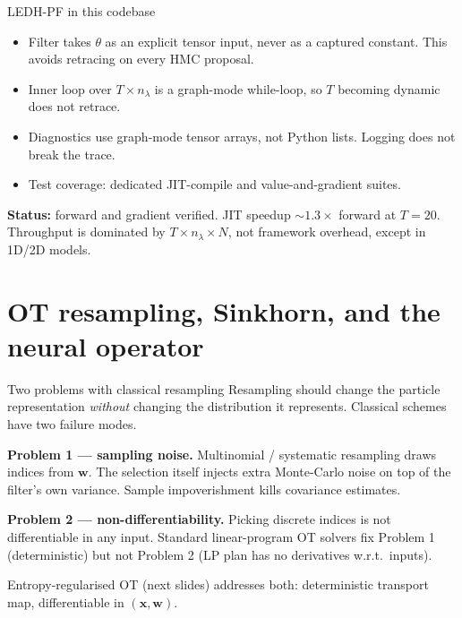 \documentclass[10pt,aspectratio=169]{beamer}
\begin{document}
\begin{frame}{LEDH-PF in this codebase}
  \begin{itemize}
    \item Filter takes $\theta$ as an explicit tensor input, never as a captured constant. This avoids retracing on every HMC proposal.
    \item Inner loop over $T \times n_\lambda$ is a graph-mode while-loop, so $T$ becoming dynamic does not retrace.
    \item Diagnostics use graph-mode tensor arrays, not Python lists. Logging does not break the trace.
    \item Test coverage: dedicated JIT-compile and value-and-gradient suites.
  \end{itemize}

  \medskip
  \textbf{Status:} forward and gradient verified. JIT speedup $\sim 1.3\times$ forward at $T{=}20$. Throughput is dominated by $T \times n_\lambda \times N$, not framework overhead, except in 1D/2D models.
\end{frame}

\section{OT resampling, Sinkhorn, and the neural operator}

\begin{frame}{Two problems with classical resampling}
  Resampling should change the particle representation \emph{without} changing the distribution it represents. Classical schemes have two failure modes.

  \medskip
  \textbf{Problem 1 --- sampling noise.}
  Multinomial / systematic resampling draws indices from $\mathbf{w}$. The selection itself injects extra Monte-Carlo noise on top of the filter's own variance. Sample impoverishment kills covariance estimates.

  \medskip
  \textbf{Problem 2 --- non-differentiability.}
  Picking discrete indices is not differentiable in any input. Standard linear-program OT solvers fix Problem 1 (deterministic) but not Problem 2 (LP plan has no derivatives w.r.t.\ inputs).

  \medskip
  Entropy-regularised OT (next slides) addresses both: deterministic transport map, differentiable in $(\mathbf{x}, \mathbf{w})$.
\end{frame}
\end{document}

